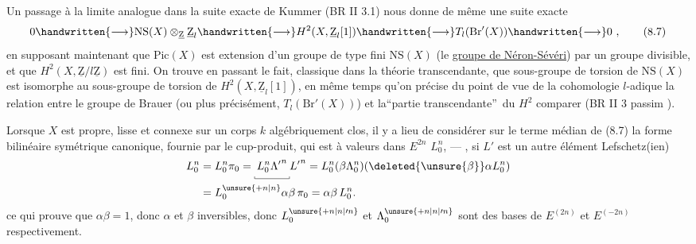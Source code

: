  Un passage à la limite analogue dans la suite exacte de Kummer (BR II 3.1) nous donne de même une suite exacte
\[
0\handwritten{\longrightarrow}\mathrm{NS}(X)\otimes_{\underline{\mathrm Z}}\underline{\mathrm Z}_l\handwritten{\longrightarrow}H^2(X,\underline{\mathrm Z}_l[1])\handwritten{\longrightarrow}T_l(\mathrm{Br}'(X))\handwritten{\longrightarrow}0\ , \tag*{(8.7)}
\]
en supposant maintenant que $\mathrm{Pic}(X)$ est extension d'un groupe de type fini $\mathrm{NS}(X)$ (le \uline{groupe de Néron-Sévéri}) par un groupe divisible, et que $H^2(X,\underline{\mathrm Z}/l\underline{\mathrm Z})$ est fini. \deleted{\unsure{(}}On trouve en passant le fait, classique dans la théorie transcendante, que  sous-groupe de torsion de $\mathrm{NS}(X)$ est isomorphe au sous-groupe de torsion de $H^2(X,\underline{\mathrm Z}_l[1])$, en même temps qu'on précise du point de vue de la cohomologie $l$-adique la relation entre le groupe de Brauer (ou plus précisément, $T_l(\mathrm{Br}'(X))$) et la\textquotedblleft partie transcendante\textquotedblright\ du $H^2$ \handwritten{,} \deleted{\unsure{;}}comparer (BR II 3 passim ).

Lorsque $X$ est  propre, lisse et connexe sur un corps $k$ algébriquement clos, il y a lieu de considérer sur le terme médian de (8.7) la forme bilinéaire symétrique canonique, fournie par le cup-produit, qui est à valeurs dans
$E^{2n}$  $L_0^n$,    --- , si $L'$ est un autre élément Lefschetz(ien)
\[
\begin{aligned}
L_0^n&=L_0^n\pi_0=\underset{\rule{.35pt}{.5ex}\rule{3.1em}{.35pt}\rule{.35pt}{.5ex}}{L_0^n{\Lambda'}^{n}}{L'}^{n}
=L_0^n(\beta\Lambda_0^n)(\deleted{\unsure{\beta}}\alpha L_0^n)\\
&=L_0^{\unsure{+n|n}}\alpha\beta\,\pi_0=\alpha\beta\, L_0^n.
\end{aligned}
\]
ce qui prouve que $\alpha\beta=1$, donc $\alpha$ et $\beta$ inversibles, donc  $L_0^{\unsure{+n|n|\prime n}}$ et $\Lambda_0^{\unsure{+n|n|\prime n}}$ sont des bases de $E^{(2n)}$ et $E^{(-2n)}$ respectivement.

